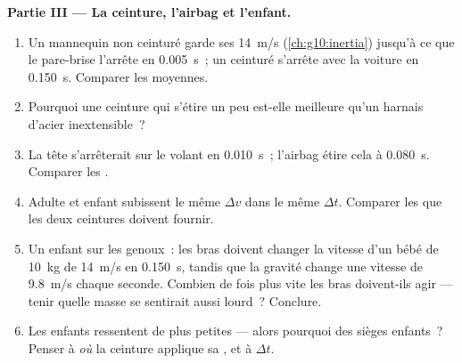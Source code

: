 \begin{problem}
\medskip
\noindent\textbf{Partie III --- La ceinture, l'airbag et l'enfant.}
\begin{enumerate}[resume]
  \item Un mannequin non ceinturé garde ses \qty{14}{m/s}
        (\cref{ch:g10:inertia}) jusqu'à ce que le pare-brise l'arrête
        en \qty{0.005}{s}~; un ceinturé s'arrête avec la voiture en
        \qty{0.150}{s}. Comparer les
         moyennes.
  \item Pourquoi une ceinture qui s'étire un peu est-elle meilleure
        qu'un harnais d'acier inextensible~?
  \item La tête s'arrêterait sur le volant en \qty{0.010}{s}~; l'airbag
        étire cela à \qty{0.080}{s}. Comparer les
        .
  \item Adulte et enfant subissent le même $\Delta v$ dans le même
        $\Delta t$. Comparer les
         que les deux
        ceintures doivent fournir.
  \item Un enfant sur les genoux~: les bras doivent changer la vitesse
        d'un bébé de \qty{10}{kg} de \qty{14}{m/s} en \qty{0.150}{s},
        tandis que la gravité change une vitesse de \qty{9.8}{m/s}
        chaque seconde. Combien de fois plus vite les bras doivent-ils
        agir --- tenir quelle masse se sentirait aussi lourd~?
        Conclure.
  \item Les enfants ressentent de plus petites
         --- alors pourquoi des sièges
        enfants~? Penser à \emph{où} la ceinture applique sa
        , et à $\Delta t$.
\end{enumerate}


\end{problem}

